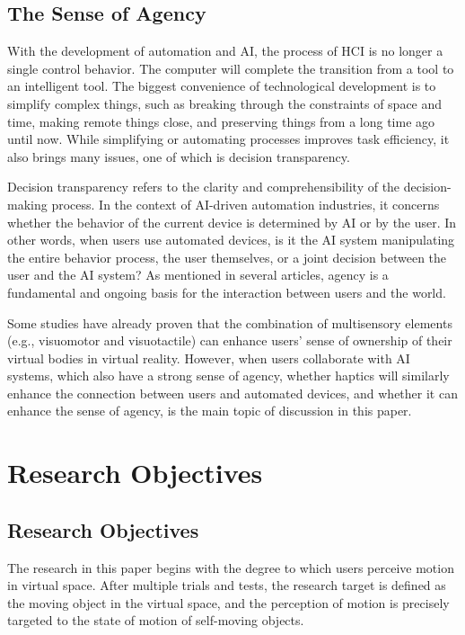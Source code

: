 \subsection{The Sense of Agency}
With the development of automation and AI, the process of HCI is no longer a single control behavior. The computer will complete the transition from a tool to an intelligent tool. The biggest convenience of technological development is to simplify complex things, such as breaking through the constraints of space and time, making remote things close, and preserving things from a long time ago until now. While simplifying or automating processes improves task efficiency, it also brings many issues, one of which is decision transparency.

Decision transparency refers to the clarity and comprehensibility of the decision-making process. In the context of AI-driven automation industries, it concerns whether the behavior of the current device is determined by AI or by the user. In other words, when users use automated devices, is it the AI system manipulating the entire behavior process, the user themselves, or a joint decision between the user and the AI system? As mentioned in several articles\cite{paper27}, agency is a fundamental and ongoing basis for the interaction between users and the world.

Some studies have already proven that the combination of multisensory elements (e.g., visuomotor and visuotactile) can enhance users' sense of ownership of their virtual bodies in virtual reality\cite{paper28}. However, when users collaborate with AI systems, which also have a strong sense of agency, whether haptics will similarly enhance the connection between users and automated devices, and whether it can enhance the sense of agency, is the main topic of discussion in this paper.


\section{Research Objectives}
\subsection{Research Objectives}
The research in this paper begins with the degree to which users perceive motion in virtual space. After multiple trials and tests, the research target is defined as the moving object in the virtual space, and the perception of motion is precisely targeted to the state of motion of self-moving objects.

